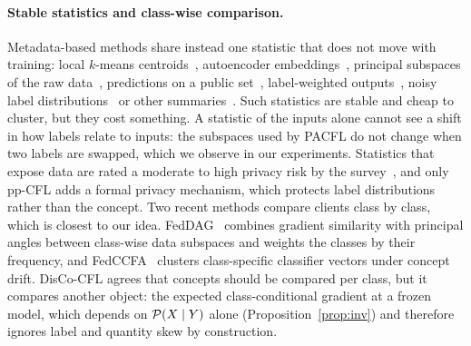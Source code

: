 \paragraph{Stable statistics and class-wise comparison.} Metadata-based methods share instead one statistic that does not move with training: local $k$-means centroids~\citep{dennis2021kfed}, autoencoder embeddings~\citep{jamalirad2022flt}, principal subspaces of the raw data~\citep{vahidian2023pacfl}, predictions on a public set~\citep{morafah2023flis}, label-weighted outputs~\citep{zhang2024mdicfl}, noisy label distributions~\citep{luo2024ppcfl} or other summaries~\citep{ren2025tdcfl,cheng2025snapcfl}. Such statistics are stable and cheap to cluster, but they cost something. A statistic of the inputs alone cannot see a shift in how labels relate to inputs: the subspaces used by PACFL do not change when two labels are swapped, which we observe in our experiments. Statistics that expose data are rated a moderate to high privacy risk by the survey~\citep[Table~4]{benali2026survey}, and only pp-CFL adds a formal privacy mechanism, which protects label distributions rather than the concept. Two recent methods compare clients class by class, which is closest to our idea. FedDAG~\citep{pramanik2026feddag} combines gradient similarity with principal angles between class-wise data subspaces and weights the classes by their frequency, and FedCCFA~\citep{chen2024fedccfa} clusters class-specific classifier vectors under concept drift. DisCo-CFL agrees that concepts should be compared per class, but it compares another object: the expected class-conditional gradient at a frozen model, which depends on $\mathcal{P}(X\mid Y)$ alone (Proposition~\ref{prop:inv}) and therefore ignores label and quantity skew by construction.

